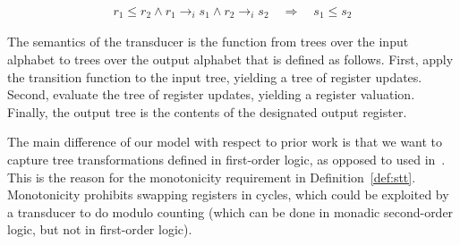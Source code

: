 \begin{definition}
\begin{itemize}
\begin{enumerate}
\begin{align*}
            r_1 \leq r_2 \land r_1 \to_i s_1  \land  r_2 \to_i s_2  \quad \Rightarrow \quad  s_1 \leq s_2
        \end{align*}
    \end{enumerate}
\end{itemize}
\end{definition}

The semantics of the transducer is  the function from trees over the input alphabet to trees over the output alphabet  that is defined as follows. First, apply the transition function to the input tree, yielding a tree of register updates. Second, evaluate the tree of register updates, yielding a register valuation. Finally, the output tree is the contents of the designated output register.



The main difference of our model with respect to prior work is that we want to capture  tree transformations defined in first-order logic, as opposed to \mso used in~\cite{bloem_comparison_2000,alurStreamingStringTransducers2011,alur2017streaming}. This is the reason for the monotonicity requirement in Definition~\ref{def:stt}. Monotonicity    prohibits swapping registers in cycles, which could be exploited by a transducer to do modulo counting (which can be done in monadic second-order logic, but not in first-order logic). 

